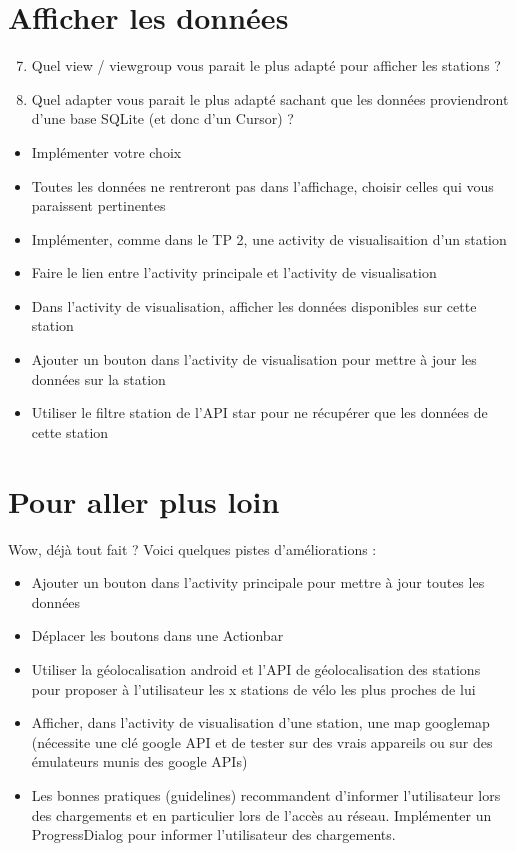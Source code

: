 \documentclass{article}
\begin{document}
\section{Afficher les données}
\begin{enumerate}
 \setcounter{enumi}{6}
\item Quel view / viewgroup vous parait le plus adapté pour afficher les stations ?
\item Quel adapter vous parait le plus adapté sachant que les données proviendront d'une base SQLite (et donc d'un Cursor) ?
\end{enumerate}
\begin{itemize} 
  \item Implémenter votre choix
  \item Toutes les données ne rentreront pas dans l'affichage, choisir celles qui vous paraissent pertinentes
  \item Implémenter, comme dans le TP 2, une activity de visualisaition d'un station
  \item Faire le lien entre l'activity principale et l'activity de visualisation
  \item Dans l'activity de visualisation, afficher les données disponibles sur cette station
  \item Ajouter un bouton dans l'activity de visualisation pour mettre à jour les données sur la station
  \item Utiliser le filtre station de l'API star pour ne récupérer que les données de cette station
\end{itemize}
\section{Pour aller plus loin}
  Wow, déjà tout fait ? Voici quelques pistes d'améliorations :
\begin{itemize}
  \item Ajouter un bouton dans l'activity principale pour mettre à jour toutes les données
  \item Déplacer les boutons dans une Actionbar
  \item Utiliser la géolocalisation android et l'API de géolocalisation des stations pour proposer à l'utilisateur les x stations de vélo les plus proches de lui
  \item Afficher, dans l'activity de visualisation d'une station, une map googlemap (nécessite une clé google API et de tester sur des vrais appareils ou sur des émulateurs munis des google APIs)
  \item Les bonnes pratiques (guidelines) recommandent d'informer l'utilisateur lors des chargements et en particulier lors de l'accès au réseau. Implémenter un ProgressDialog pour informer l'utilisateur des chargements.
 \end{itemize}
\end{document}
